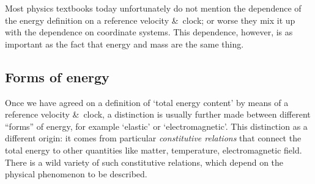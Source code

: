 \documentclass[a4paper,12pt,%
onecolumn,oneside,%
british%
]{memoir}
\newcommand*{\amp}{\&}
\renewcommand*{\|}[1][]{\nonscript\:#1\vert\nonscript\:\mathopen{}}
\begin{document}
\begin{warning}
  Most physics textbooks today unfortunately do not mention the dependence of the energy definition on a reference velocity \amp\ clock; or worse they mix it up with the dependence on coordinate systems. This dependence, however, is as important as the fact that energy and mass are the same thing.
\end{warning}

\subsection{Forms of energy}
\label{sec:energy_forms}

Once we have agreed on a definition of \enquote*{total energy content} by means of a  reference velocity \amp\ clock, a distinction is usually further made between different \enquote{forms} of energy,
for example \enquote*{elastic} or \enquote*{electromagnetic}. This distinction as a different origin: it comes from particular \emph{constitutive relations} that connect the total energy to other quantities like matter, temperature, electromagnetic field. There is a wild variety of such constitutive relations, which depend on the physical phenomenon to be described.
\end{document}
